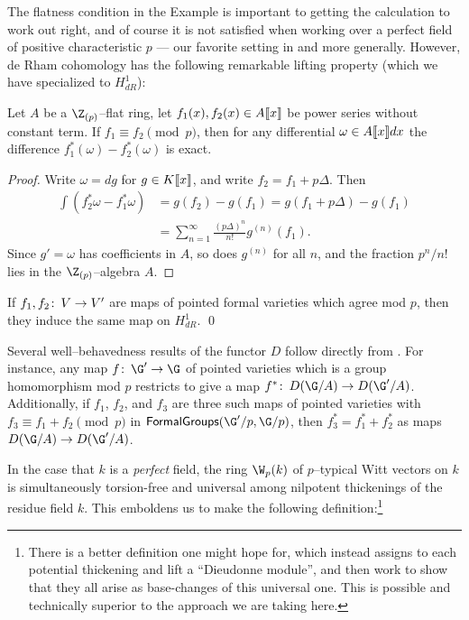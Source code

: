 The flatness condition in the Example is important to getting the calculation to work out right, and of course it is not satisfied when working over a perfect field of positive characteristic $p$ --- our favorite setting in  and  more generally.  However, de Rham cohomology has the following remarkable lifting property (which we have specialized to $H^1_{dR}$):

\begin{theorem}
Let $A$ be a $\Z_{(p)}$--flat ring, let $f_1(x), f_2(x) \in A\llbracket{x}\rrbracket$ be power series without constant term.  If $f_1 \equiv f_2 \pmod{p}$, then for any differential $\omega \in A\llbracket{x}\rrbracket dx$ the difference $f_1^*(\omega) - f_2^*(\omega)$ is exact.
\end{theorem}
\begin{proof}
Write $\omega = dg$ for $g \in K\llbracket{x}\rrbracket$, and write $f_2 = f_1 + p\Delta$.  Then
\begin{align*}
\int \left( f_2^* \omega - f_1^* \omega \right) & = g(f_2) - g(f_1) = g(f_1 + p\Delta) - g(f_1) \\
& = \sum_{n = 1}^\infty \frac{(p\Delta)^n}{n!} g^{(n)}(f_1).
\end{align*}
Since $g' = \omega$ has coefficients in $A$, so does $g^{(n)}$ for all $n$, and the fraction $p^n/n!$ lies in the $\Z_{(p)}$--algebra $A$.
\end{proof}

\begin{corollary}[{$H^1_{dR}$ is ``crystalline''}]\label{H1dRIsCrystalline}
If $f_1, f_2\colon\thinspace V \to V'$ are maps of pointed formal varieties which agree mod $p$, then they induce the same map on $H^1_{dR}$. \qed
\end{corollary}

Several well--behavedness results of the functor $D$ follow directly from .  For instance, any map $f\co \G' \to \G$ of pointed varieties which is a group homomorphism mod $p$ restricts to give a map $f^*\co D(\G/A) \to D(\G'/A)$.  Additionally, if $f_1$, $f_2$, and $f_3$ are three such maps of pointed varieties with $f_3 \equiv f_1 + f_2 \pmod{p}$ in $\CatOf{FormalGroups}(\G'/p, \G/p)$, then $f_3^* = f_1^* + f_2^*$ as maps $D(\G/A) \to D(\G'/A)$.

In the case that $k$ is a \emph{perfect} field, the ring $\W_p(k)$ of $p$--typical Witt vectors on $k$ is simultaneously torsion-free and universal among nilpotent thickenings of the residue field $k$.  This emboldens us to make the following definition:\footnote{There is a better definition one might hope for, which instead assigns to each potential thickening and lift a ``Dieudonne module'', and then work to show that they all arise as base-changes of this universal one.  This is possible and technically superior to the approach we are taking here.}

